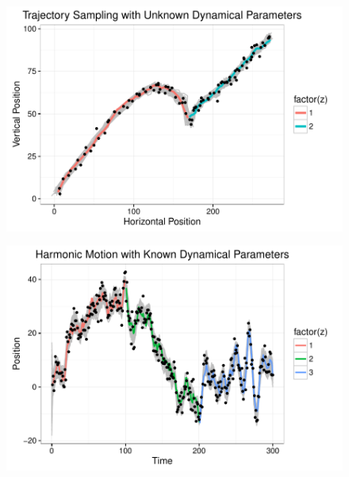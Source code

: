 \documentclass{beamer}
\begin{document}
\begin{frame}
\begin{figure}
  \centering
  \includegraphics[width = 1\linewidth]{"./plot/lds/02_projectile_unknown"}
\end{figure}
\end{frame}

\begin{frame}
\begin{figure}
  \centering
  \includegraphics[width = 1\linewidth]{"./plot/lds/03_harmonic_known"}
\end{figure}
\end{frame}
\end{document}
